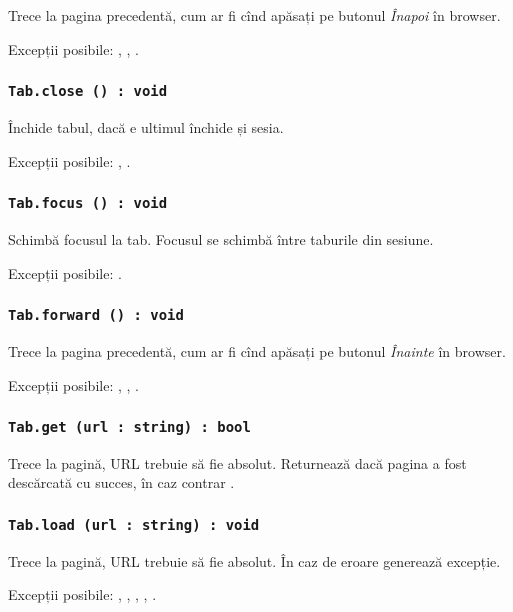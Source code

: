 Trece la pagina precedentă, cum ar fi cînd apăsați pe butonul \textit{Înapoi} în browser.

Excepții posibile: , , .

\subsubsection{\lstinline|Tab.close () : void|}

Închide tabul, dacă e ultimul închide și sesia.

Excepții posibile: , .

\subsubsection{\lstinline|Tab.focus () : void|}

Schimbă focusul la tab. Focusul se schimbă între taburile din sesiune.

Excepții posibile: .

\subsubsection{\lstinline|Tab.forward () : void|}

Trece la pagina precedentă, cum ar fi cînd apăsați pe butonul \textit{Înainte} în browser.


Excepții posibile: , , .

\subsubsection{\lstinline|Tab.get (url : string) : bool|}

Trece la pagină, URL trebuie să fie absolut. Returnează \true{} dacă pagina a fost descărcată cu succes, în caz contrar \false.

\subsubsection{\lstinline|Tab.load (url : string) : void|}

Trece la pagină, URL trebuie să fie absolut. În caz de eroare generează excepție.

Excepții posibile: , , , , .

